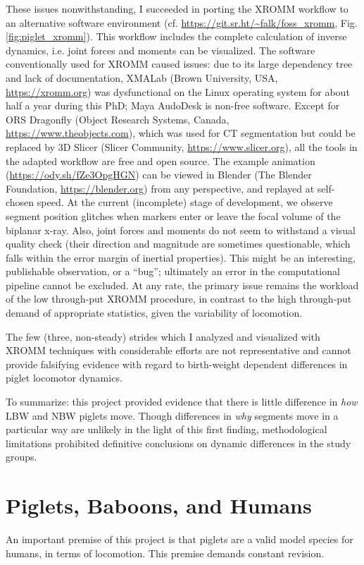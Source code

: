 These issues nonwithstanding, I succeeded in porting the XROMM workflow \citep{Brainerd2010} to an alternative software environment (cf. \url{https://git.sr.ht/\~falk/foss\_xromm}, Fig. \ref{fig:piglet_xromm}).
This workflow includes the complete calculation of inverse dynamics, i.e. joint forces and moments can be visualized.
The software conventionally used for XROMM caused issues: due to its large dependency tree and lack of documentation, XMALab (Brown University, USA, \url{https://xromm.org}) was dysfunctional on the Linux operating system for about half a year during this PhD; Maya AudoDesk is non-free software.
Except for ORS Dragonfly (Object Research Systems, Canada, \url{https://www.theobjects.com}), which was used for CT segmentation but could be replaced by 3D Slicer (Slicer Community, \url{https://www.slicer.org}), all the tools in the adapted workflow are free and open source.
The example animation (\url{https://ody.sh/fZe3OpgHGN}) can be viewed in Blender (The Blender Foundation, \url{https://blender.org}) from any perspective, and replayed at self-chosen speed.
At the current (incomplete) stage of development, we observe segment position glitches when markers enter or leave the focal volume of the biplanar x-ray.
Also, joint forces and moments do not seem to withstand a visual quality check (their direction and magnitude are sometimes questionable, which falls within the error margin of inertial properties).
This might be an interesting, publishable observation, or a ``bug''; ultimately an error in the computational pipeline cannot be excluded.
At any rate, the primary issue remains the workload of the low through-put XROMM procedure, in contrast to the high through-put demand of appropriate statistics, given the variability of locomotion.

The few (three, non-steady) strides which I analyzed and visualized with XROMM techniques with considerable efforts are not representative and cannot provide falsifying evidence with regard to birth-weight dependent differences in piglet locomotor dynamics.


To summarize: this project provided evidence that there is little difference in \emph{how} LBW and NBW piglets move.
Though differences in \emph{why} segments move in a particular way are unlikely in the light of this first finding, methodological limitations prohibited definitive conclusions on dynamic differences in the study groups.


\section{Piglets, Baboons, and Humans}
\label{sec:orga2bf40c}
An important premise of this project is that piglets are a valid model species for humans, in terms of locomotion.
This premise demands constant revision.


